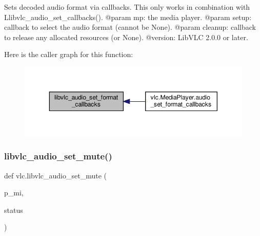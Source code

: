 \begin{DoxyVerb}Sets decoded audio format via callbacks.
This only works in combination with L{libvlc_audio_set_callbacks}().
@param mp: the media player.
@param setup: callback to select the audio format (cannot be None).
@param cleanup: callback to release any allocated resources (or None).
@version: LibVLC 2.0.0 or later.
\end{DoxyVerb}
 Here is the caller graph for this function\+:
\nopagebreak
\begin{figure}[H]
\begin{center}
\leavevmode
\includegraphics[width=350pt]{namespacevlc_a0191b731e6860891d7788976a24c73b9_icgraph}
\end{center}
\end{figure}
\mbox{\label{namespacevlc_a76eac9d168adc4bab5d64c0e08e0333c}} 
\subsubsection{\texorpdfstring{libvlc\+\_\+audio\+\_\+set\+\_\+mute()}{libvlc\_audio\_set\_mute()}}
{\footnotesize\ttfamily def vlc.\+libvlc\+\_\+audio\+\_\+set\+\_\+mute (\begin{DoxyParamCaption}\item[{}]{p\+\_\+mi,  }\item[{}]{status }\end{DoxyParamCaption})}

